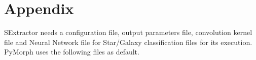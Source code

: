 \documentclass[a4paper,10pt]{article}
\begin{document}

\section{Appendix}
SExtractor needs a configuration file, output parameters file, convolution kernel file and Neural Network file for Star/Galaxy classification files for its execution. 
PyMorph uses the following files as default.
\end{document}
